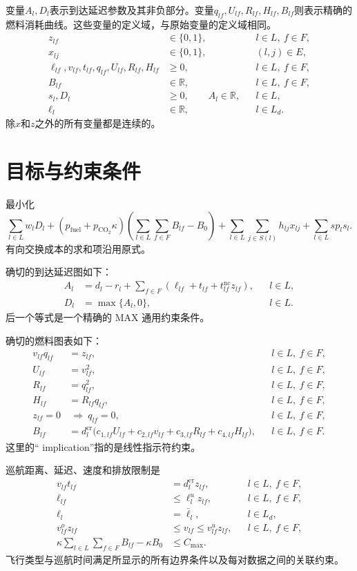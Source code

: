 \documentclass{article}
\begin{document}
变量$A_l,D_l$表示到达延迟参数及其非负部分。变量$q_{lf},U_{lf},R_{lf},H_{lf},B_{lf}$则表示精确的燃料消耗曲线。这些变量的定义域，与原始变量的定义域相同。
\begin{align}
 z_{lf}&\in\{0,1\}, & &l\in L,\ f\in F,\\
 x_{lj}&\in\{0,1\}, & &(l,j)\in E,\\
 \ell_{lf},v_{lf},t_{lf},q_{lf},U_{lf},R_{lf},H_{lf}&\geq0,
 &&l\in L,\ f\in F,\\
 B_{lf}&\in\mathbb R, &&l\in L,\ f\in F,\\
 s_l,D_l&\geq0,\qquad A_l\in\mathbb R, &&l\in L,\\
 \ell_l&\in\mathbb R, &&l\in L_d.
\end{align}
除$x$和$z$之外的所有变量都是连续的。

\section{目标与约束条件}
最小化
\begin{equation}
 \sum_{l\in L}w_lD_l
 +(p_{\mathrm{fuel}}+p_{\mathrm{CO}_2}\kappa)
 \left(\sum_{l\in L}\sum_{f\in F}B_{lf}-B_0\right)
 +\sum_{l\in L}\sum_{j\in S(l)}h_{lj}x_{lj}
 +\sum_{l\in L}sp_ls_l.
\end{equation}
有向交换成本的求和项沿用原式。

确切的到达延迟图如下：
\begin{align}
 A_l&=d_l-r_l+\sum_{f\in F}
 (\ell_{lf}+t_{lf}+t_{lf}^{\mathrm{nc}}z_{lf}), &&l\in L,\\
 D_l&=\max\{A_l,0\}, &&l\in L.
\end{align}
后一个等式是一个精确的 MAX 通用约束条件。

确切的燃料图表如下：
\begin{align}
 v_{lf}q_{lf}&=z_{lf}, &&l\in L,\ f\in F,\\
 U_{lf}&=v_{lf}^2, &&l\in L,\ f\in F,\\
 R_{lf}&=q_{lf}^2, &&l\in L,\ f\in F,\\
 H_{lf}&=R_{lf}q_{lf}, &&l\in L,\ f\in F,\\
 z_{lf}=0&\ \Longrightarrow\ q_{lf}=0, &&l\in L,\ f\in F,\\
 B_{lf}&=d_l^{\mathrm{cr}}\bigl(c_{1,lf}U_{lf}+c_{2,lf}v_{lf}
                 +c_{3,lf}R_{lf}+c_{4,lf}H_{lf}\bigr),
 &&l\in L,\ f\in F.
\end{align}
这里的“ implication”指的是线性指示符约束。

巡航距离、延迟、速度和排放限制是
\begin{align}
 v_{lf}t_{lf}&=d_l^{\mathrm{cr}}z_{lf}, &&l\in L,\ f\in F,\\
 \ell_{lf}&\leq\ell_l^u z_{lf}, &&l\in L,\ f\in F,\\
 \ell_l&=\bar\ell_l, &&l\in L_d,\\
 v_{lf}^{o}z_{lf}&\leq v_{lf}\leq v_{lf}^{u}z_{lf}, &&l\in L,\ f\in F,\\
 \kappa\sum_{l\in L}\sum_{f\in F}B_{lf}-\kappa B_0&\leq C_{\max}.
\end{align}
飞行类型与巡航时间满足所显示的所有边界条件以及每对数据之间的关联约束。
\end{document}
